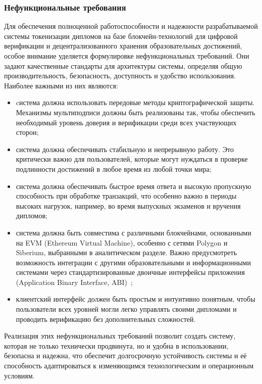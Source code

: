 \subsubsection{Нефункциональные требования}
\label{subsec:nonfunc_req}

Для обеспечения полноценной работоспособности и надежности разрабатываемой системы токенизации дипломов на базе блокчейн-технологий для цифровой верификации и децентрализованного хранения образовательных достижений, особое внимание уделяется формулировке нефункциональных требований. Они задают качественные стандарты для архитектуры системы, определяя общую производительность, безопасность, доступность и удобство использования. Наиболее важными из них являются:

\begin{itemize}
    \item cистема должна использовать передовые методы криптографической защиты. Механизмы мультиподписи должны быть реализованы так, чтобы обеспечить необходимый уровень доверия и верификации среди всех участвующих сторон;
    \item система должна обеспечивать стабильную и непрерывную работу. Это критически важно для пользователей, которые могут нуждаться в проверке подлинности достижений в любое время из любой точки мира;
    \item система должна обеспечивать быстрое время ответа и высокую пропускную способность при обработке транзакций, что особенно важно в периоды высоких нагрузок, например, во время выпускных экзаменов и вручения дипломов;
    \item система должна быть совместима с различными блокчейнами, основанными на EVM (Ethereum Virtual Machine), особенно с сетями Polygon и Siberium, выбранными в аналитическом разделе. Важно предусмотреть возможность интеграции с другими образовательными и информационными системами через стандартизированные двоичные интерфейсы приложения (Application Binary Interface, ABI)~\cite{bib:sc_abi};
    \item клиентский интерфейс должен быть простым и интуитивно понятным, чтобы пользователи всех уровней могли легко управлять своими дипломами и проводить верификацию без дополнительных сложностей.
\end{itemize}

Реализация этих нефункциональных требований позволит создать систему, которая не только технически продвинута, но и удобна в использовании, безопасна и надежна, что обеспечит долгосрочную устойчивость системы и её способность адаптироваться к изменяющимся технологическим и операционным условиям.


